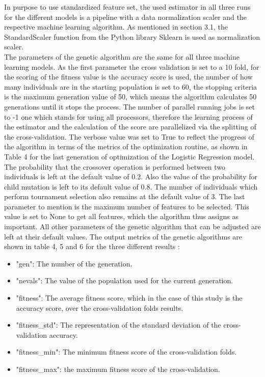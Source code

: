 \documentclass[../masterarbeit.tex]{subfiles}
\begin{document}
In purpose to use standardized feature set, the used estimator in all three runs for the different models is a pipeline with a data normalization scaler and the respective machine learning algorithm. As mentioned in section 3.1, the StandardScaler function from the Python library Sklearn is used as normalization scaler. \\







The parameters of the genetic algorithm are the same for all three machine learning models. As the first parameter the cross validation is set to a 10 fold, for the scoring of the fitness value is the accuracy score is used, the number of how many individuals are in the starting population is set to 60, the stopping criteria is the maximum generation value of 50, which means the algorithm calculates 50 generations until it stops the process. The number of parallel running jobs is set to -1 one which stands for using all processors, therefore the learning process of the estimator and the calculation of the score are parallelized via the splitting of the cross-validation. The verbose value was set to True to reflect the progress of the algorithm in terms of the metrics of the optimization routine, as shown in Table 4 for the last generation of optimization of the Logistic Regression model. The probability that the crossover operation is performed between two individuals is left at the default value of 0.2. Also the value of the probability for child mutation is left to its default value of 0.8. The number of individuals which perform tournament selection also remains at the default value of 3. The last parameter to mention is the maximum number of features to be selected. This value is set to None to get all features, which the algorithm thus assigns as important. All other parameters of the genetic algorithm that can be adjusted are left at their default values. \autocites{Sklearn_genetic_feature_docu:2022}
The output metrics of the genetic algorithms are shown in table 4, 5 and 6 for the three different results \textcite[]{Sklearn_genetic_feature_docu_metrics:2022}: 
\begin{itemize}
	\item "gen": The number of the generation.
	\item "nevals": The value of the population used for the current generation.
	\item "fitness": The average fitness score, which in the case of this study is the accuracy score, over the cross-validation folds results.
	\item "fitness\_std": The representation of the standard deviation of the cross-validation accuracy.
	\item "fitness\_min": The minimum fitness score of the cross-validation folds.
	\item "fitness\_max": the maximum fitness score of the cross-validation. 
\end{itemize}
\end{document}
